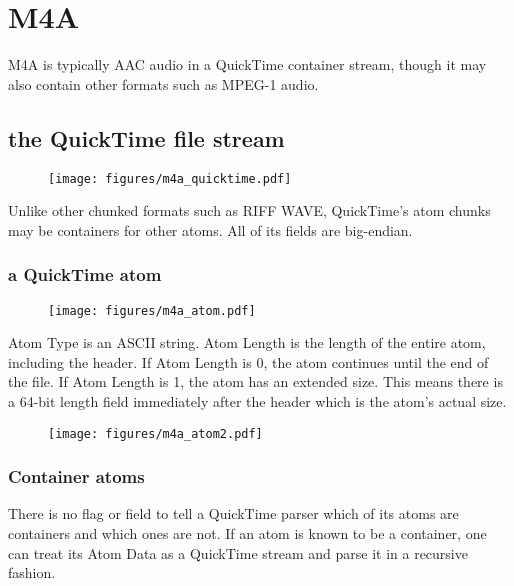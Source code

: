 
\chapter{M4A}
\label{m4a}
M4A is typically AAC audio in a QuickTime container stream, though
it may also contain other formats such as MPEG-1 audio.

\section{the QuickTime file stream}
\begin{figure}[h]
\texttt{[image: figures/m4a\_quicktime.pdf]}
\end{figure}
\par
\noindent
Unlike other chunked formats such as RIFF WAVE, QuickTime's atom chunks
may be containers for other atoms.  All of its fields are big-endian.
\subsection{a QuickTime atom}
\begin{figure}[h]
\texttt{[image: figures/m4a\_atom.pdf]}
\end{figure}
Atom Type is an ASCII string.
Atom Length is the length of the entire atom, including the header.
If Atom Length is 0, the atom continues until the end of the file.
If Atom Length is 1, the atom has an extended size.  This means
there is a 64-bit length field immediately after the header which is
the atom's actual size.
\begin{figure}[h]
\texttt{[image: figures/m4a\_atom2.pdf]}
\end{figure}
\subsection{Container atoms}
There is no flag or field to tell a QuickTime parser which
of its atoms are containers and which ones are not.
If an atom is known to be a container, one can treat its Atom Data
as a QuickTime stream and parse it in a recursive fashion.
